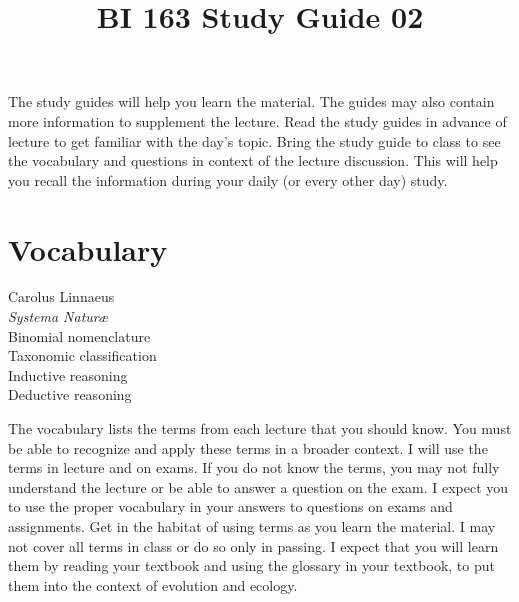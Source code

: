 \documentclass[letterpaper]{tufte-handout}
\title{BI 163 Study Guide 02\hfill}
\date{} %
\begin{document}
\maketitle	%



The study guides will help you learn the material. The guides may also contain more information to supplement the lecture.  Read the study guides in advance of lecture to get familiar with the day's topic. Bring the study guide to class to see the vocabulary and questions in context of the lecture discussion. This will help you recall the information during your daily (or every other day) study.

\section{Vocabulary}

\vspace{-1\baselineskip}
\begin{multicols}{2}
Carolus Linnaeus\\
\textit{Systema Natur\ae}\\
Binomial nomenclature\\
Taxonomic classification\\
Inductive reasoning\\
Deductive reasoning
\end{multicols}

The vocabulary lists the terms from each lecture that you should know. You must be able to recognize and apply these terms in a broader context.  I will use the terms in lecture and on exams. If you do not know the terms, you may not fully understand the lecture or be able to answer a question on the exam. I expect you to use the proper vocabulary in your answers to questions on exams and assignments.  Get in the habitat of using terms as you learn the material.  I may not cover all terms in class or do so only in passing.  I expect that you will learn them by reading your textbook and using the glossary in your textbook, to put them into the context of evolution and ecology.
\end{document}
